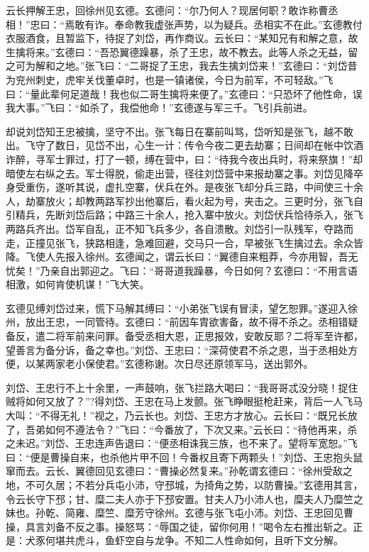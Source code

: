 云长押解王忠，回徐州见玄德。玄德问：“尔乃何人？现居何职？敢诈称曹丞相！”忠曰：“焉敢有诈。奉命教我虚张声势，以为疑兵。丞相实不在此。”玄德教付衣服酒食，且暂监下，待捉了刘岱，再作商议。云长曰：“某知兄有和解之意，故生擒将来。”玄德曰：“吾恐翼德躁暴，杀了王忠，故不教去。此等人杀之无益，留之可为解和之地。”张飞曰：“二哥捉了王忠，我去生擒刘岱来！”玄德曰：“刘岱昔为兖州刺史，虎牢关伐董卓时，也是一镇诸侯，今日为前军，不可轻敌。”飞曰：“量此辈何足道哉！我也似二哥生擒将来便了。”玄德曰：“只恐坏了他性命，误我大事。”飞曰：“如杀了，我偿他命！”玄德遂与军三千。飞引兵前进。

却说刘岱知王忠被擒，坚守不出。张飞每日在寨前叫骂，岱听知是张飞，越不敢出。飞守了数日，见岱不出，心生一计：传令今夜二更去劫寨；日间却在帐中饮酒诈醉，寻军士罪过，打了一顿，缚在营中，曰：“待我今夜出兵时，将来祭旗！”却暗使左右纵之去。军士得脱，偷走出营，径往刘岱营中来报劫寨之事。刘岱见降卒身受重伤，遂听其说，虚扎空寨，伏兵在外。是夜张飞却分兵三路，中间使三十余人，劫寨放火；却教两路军抄出他寨后，看火起为号，夹击之。三更时分，张飞自引精兵，先断刘岱后路；中路三十余人，抢入寨中放火。刘岱伏兵恰待杀入，张飞两路兵齐出。岱军自乱，正不知飞兵多少，各自溃散。刘岱引一队残军，夺路而走，正撞见张飞，狭路相逢，急难回避，交马只一合，早被张飞生擒过去。余众皆降。飞使人先报入徐州。玄德闻之，谓云长曰：“翼德自来粗莽，今亦用智，吾无忧矣！”乃亲自出郭迎之。飞曰：“哥哥道我躁暴，今日如何？玄德曰：“不用言语相激，如何肯使机谋！”飞大笑。

玄德见缚刘岱过来，慌下马解其缚曰：“小弟张飞误有冒渎，望乞恕罪。”遂迎入徐州，放出王忠，一同管待。玄德曰：“前因车胄欲害备，故不得不杀之。丞相错疑备反，遣二将军前来问罪。备受丞相大恩，正思报效，安敢反耶？二将军至许都，望善言为备分诉，备之幸也。”刘岱、王忠曰：“深荷使君不杀之恩，当于丞相处方便，以某两家老小保使君。”玄德称谢。次日尽还原领军马，送出郭外。

刘岱、王忠行不上十余里，一声鼓响，张飞拦路大喝曰：“我哥哥忒没分晓！捉住贼将如何又放了？”?得刘岱、王忠在马上发颤。张飞睁眼挺枪赶来，背后一人飞马大叫：“不得无礼！”视之，乃云长也。刘岱、王忠方才放心。云长曰：“既兄长放了，吾弟如何不遵法令？”飞曰：“今番放了，下次又来。”云长曰：“待他再来，杀之未迟。”刘岱、王忠连声告退曰：“便丞相诛我三族，也不来了。望将军宽恕。”飞曰：“便是曹操自来，也杀他片甲不回！今番权且寄下两颗头！”刘岱、王忠抱头鼠窜而去。云长、翼德回见玄德曰：“曹操必然复来。”孙乾谓玄德曰：“徐州受敌之地，不可久居；不若分兵屯小沛，守邳城，为掎角之势，以防曹操。”玄德用其言，令云长守下邳；甘、糜二夫人亦于下邳安置。甘夫人乃小沛人也，糜夫人乃糜竺之妹也。孙乾、简雍、糜竺、糜芳守徐州。玄德与张飞屯小沛。刘岱、王忠回见曹操，具言刘备不反之事。操怒骂：“辱国之徒，留你何用！”喝令左右推出斩之。正是：犬豕何堪共虎斗，鱼虾空自与龙争。不知二人性命如何，且听下文分解。